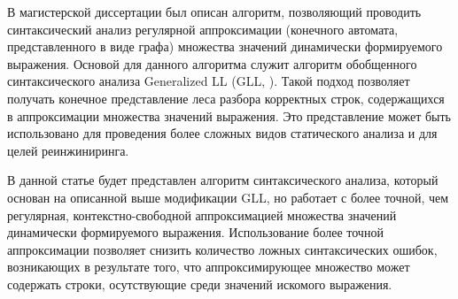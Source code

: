 В магистерской диссертации \cite{gll_reg} был описан алгоритм, позволяющий проводить синтаксический анализ регулярной аппроксимации (конечного автомата, представленного в виде графа) множества значений динамически формируемого выражения. Основой для данного алгоритма служит алгоритм обобщенного синтаксического анализа Generalized LL (GLL, \cite{gll}).
Такой подход позволяет получать конечное представление леса разбора \cite{sppf} корректных строк, содержащихся в аппроксимации множества значений выражения. Это представление может быть использовано для проведения более сложных видов статического анализа и для целей реинжиниринга.

В данной статье будет представлен алгоритм синтаксического анализа, который основан на описанной выше модификации GLL, но работает с более точной, чем регулярная, контекстно-свободной аппроксимацией множества значений динамически формируемого выражения. 
Использование более точной аппроксимации позволяет снизить количество ложных синтаксических ошибок, возникающих в результате того, что аппроксимирующее множество может содержать строки, осутствующие среди значений искомого выражения.
